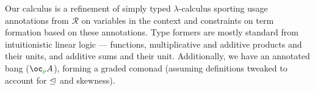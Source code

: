 \documentclass[submission,copyright,creativecommons]{eptcs}
\begin{document}
Our calculus is a refinement of simply typed $\lambda$-calculus sporting usage
annotations from $\mathscr R$ on variables in the context and constraints on
term formation based on these annotations.
Type formers are mostly standard from intuitionistic linear logic --- functions,
multiplicative and additive products and their units, and additive sums and
their unit.
Additionally, we have an annotated bang ($\excl{\rho}{A}$), forming a graded
comonad (assuming definitions tweaked to account for $\trianglelefteq$ and skewness).

\end{document}
